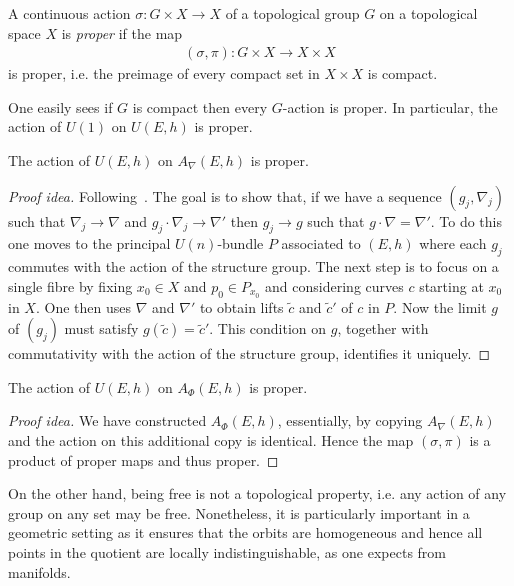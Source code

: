 \documentclass[12pt]{ociamthesis}  %
\begin{document}
\begin{definition}
  A continuous action $\sigma : G\times X\to X$ of a topological group $G$
  on a topological space $X$ is \emph{proper} if the map
  \begin{align}\label{eq:proper_map}
    (\sigma,\pi) : G\times X \to X\times X
  \end{align}
  is proper, i.e. the preimage of every compact set in $X\times X$
  is compact.
\end{definition}

\begin{example}
  One easily sees if $G$ is compact then every $G$-action is proper.
  In particular, the action of $U(1)$ on $U(E,h)$ is
  proper.
\end{example}

\begin{example}\label{ex:h_proper_action}
  The action of $U(E,h)$ on $A_\nabla(E,h)$ is proper.
  \begin{proof}[Proof idea]
    Following~\cite[{Proposition 7.1.14}]{kobayashi1987}.
    The goal is to show that, if we have a sequence $(g_j,\nabla_j)$
    such that $\nabla_j\to\nabla$ and $g_j\cdot\nabla_j\to\nabla'$
    then $g_j\to g$ such that $g\cdot\nabla = \nabla'$. To do this
    one moves to the principal $U(n)$-bundle $P$ associated to $(E,h)$
    where each $g_j$ commutes with the action of the structure
    group. The next step is to focus on a single fibre by fixing $x_0\in X$ and
    $p_0\in P_{x_0}$ and considering curves $c$ starting at $x_0$ in $X$.
    One then uses $\nabla$ and $\nabla'$ to obtain lifts $\tilde c$ and
    $\tilde c'$ of $c$ in $P$. Now the limit $g$ of $(g_j)$ must satisfy
    $g(\tilde c) = \tilde c'$. This condition on $g$, together with
    commutativity with the action of the structure group, identifies it
    uniquely.
  \end{proof}
\end{example}

\begin{example}\label{ex:higgs_proper_action}
  The action of $U(E,h)$ on $A_\Phi(E,h)$ is proper.
  \begin{proof}[Proof idea]
    We have constructed $A_\Phi(E,h)$, essentially, by copying $A_\nabla(E,h)$
    and the action on this additional copy is identical. Hence the map
    $(\sigma,\pi)$ is a product of proper maps and thus proper.
  \end{proof}
\end{example}

On the other hand, being free is not a topological property, i.e. any action of
any group on any set may be free. Nonetheless, it is particularly important in a
geometric setting as it ensures that the orbits are homogeneous and hence all
points in the quotient are locally indistinguishable, as one expects from
manifolds.
\end{document}
